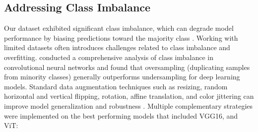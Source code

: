 \documentclass[a4paper,12pt]{report}
\begin{document}
\subsection{Addressing Class Imbalance}

Our dataset exhibited significant class imbalance, which can degrade model performance by biasing predictions toward the majority class \citep{krawczyk2016learning}. Working with limited datasets often introduces challenges related to class imbalance and overfitting. \citep{buda2018systematic} conducted a comprehensive analysis of class imbalance in convolutional neural networks and found that oversampling (duplicating samples from minority classes) generally outperforms undersampling for deep learning models. Standard data augmentation techniques such as resizing, random horizontal and vertical flipping, rotation, affine translation, and color jittering can improve model generalization and robustness \citep{yang2022augmentation,wu2024augmentation}. Multiple complementary strategies were implemented on the best performing models that included VGG16, and ViT:

\end{document}
